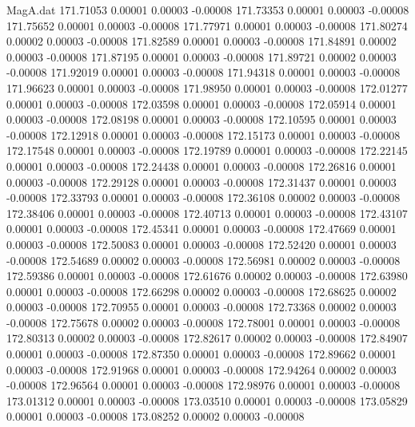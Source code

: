 \begin{filecontents}{MagA.dat}
 171.71053    0.00001    0.00003   -0.00008
 171.73353    0.00001    0.00003   -0.00008
 171.75652    0.00001    0.00003   -0.00008
 171.77971    0.00001    0.00003   -0.00008
 171.80274    0.00002    0.00003   -0.00008
 171.82589    0.00001    0.00003   -0.00008
 171.84891    0.00002    0.00003   -0.00008
 171.87195    0.00001    0.00003   -0.00008
 171.89721    0.00002    0.00003   -0.00008
 171.92019    0.00001    0.00003   -0.00008
 171.94318    0.00001    0.00003   -0.00008
 171.96623    0.00001    0.00003   -0.00008
 171.98950    0.00001    0.00003   -0.00008
 172.01277    0.00001    0.00003   -0.00008
 172.03598    0.00001    0.00003   -0.00008
 172.05914    0.00001    0.00003   -0.00008
 172.08198    0.00001    0.00003   -0.00008
 172.10595    0.00001    0.00003   -0.00008
 172.12918    0.00001    0.00003   -0.00008
 172.15173    0.00001    0.00003   -0.00008
 172.17548    0.00001    0.00003   -0.00008
 172.19789    0.00001    0.00003   -0.00008
 172.22145    0.00001    0.00003   -0.00008
 172.24438    0.00001    0.00003   -0.00008
 172.26816    0.00001    0.00003   -0.00008
 172.29128    0.00001    0.00003   -0.00008
 172.31437    0.00001    0.00003   -0.00008
 172.33793    0.00001    0.00003   -0.00008
 172.36108    0.00002    0.00003   -0.00008
 172.38406    0.00001    0.00003   -0.00008
 172.40713    0.00001    0.00003   -0.00008
 172.43107    0.00001    0.00003   -0.00008
 172.45341    0.00001    0.00003   -0.00008
 172.47669    0.00001    0.00003   -0.00008
 172.50083    0.00001    0.00003   -0.00008
 172.52420    0.00001    0.00003   -0.00008
 172.54689    0.00002    0.00003   -0.00008
 172.56981    0.00002    0.00003   -0.00008
 172.59386    0.00001    0.00003   -0.00008
 172.61676    0.00002    0.00003   -0.00008
 172.63980    0.00001    0.00003   -0.00008
 172.66298    0.00002    0.00003   -0.00008
 172.68625    0.00002    0.00003   -0.00008
 172.70955    0.00001    0.00003   -0.00008
 172.73368    0.00002    0.00003   -0.00008
 172.75678    0.00002    0.00003   -0.00008
 172.78001    0.00001    0.00003   -0.00008
 172.80313    0.00002    0.00003   -0.00008
 172.82617    0.00002    0.00003   -0.00008
 172.84907    0.00001    0.00003   -0.00008
 172.87350    0.00001    0.00003   -0.00008
 172.89662    0.00001    0.00003   -0.00008
 172.91968    0.00001    0.00003   -0.00008
 172.94264    0.00002    0.00003   -0.00008
 172.96564    0.00001    0.00003   -0.00008
 172.98976    0.00001    0.00003   -0.00008
 173.01312    0.00001    0.00003   -0.00008
 173.03510    0.00001    0.00003   -0.00008
 173.05829    0.00001    0.00003   -0.00008
 173.08252    0.00002    0.00003   -0.00008

\end{filecontents}
